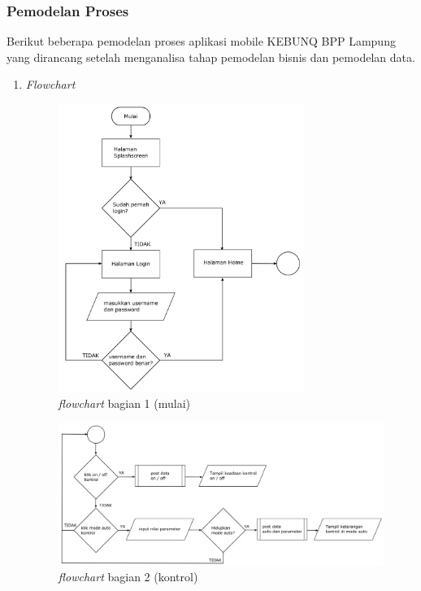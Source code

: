 \begin{flushleft}
\begin{justify}
        \subsubsection{Pemodelan Proses}
        Berikut beberapa pemodelan proses aplikasi mobile KEBUNQ BPP Lampung yang dirancang setelah menganalisa tahap pemodelan bisnis dan 
            pemodelan data.
        \begin{enumerate}[label=\alph*.]
            \item \emph{Flowchart}\\
            \begin{figure}[ht]
                \centering
                \includegraphics[width=8cm]{images/bab 4/fc 1.png}
                \caption{\textit{flowchart} bagian 1 (mulai)}
            \end{figure}
            \begin{figure}[ht]
                \centering
                \includegraphics[width=12cm]{images/bab 4/fc-kontrol.png}
                \caption{\textit{flowchart} bagian 2 (kontrol)}
            \end{figure}
            \begin{figure}[ht]

\end{figure}
\end{enumerate}
\end{justify}
\end{flushleft}
